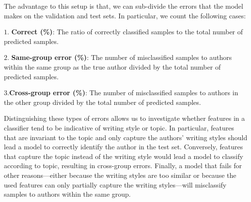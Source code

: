 \documentclass[11pt]{article}
\begin{document}

The advantage to this setup is that, we can sub-divide the errors that the model makes on the validation and test sets. In particular, we count the following cases:

\noindent$1.$ \textbf{Correct (\%)}: The ratio of correctly classified samples to the total number of predicted samples.

\noindent$2.$ \textbf{Same-group error (\%)}: The number of misclassified samples to authors within the same group as the true author divided by the total number of predicted samples.

\noindent$3.$\textbf{Cross-group error (\%)}: The number of misclassified samples to authors in the other group divided by the total number of predicted samples.

Distinguishing these types of errors allows us to investigate whether features in a classifier tend to be indicative of writing style or topic. In particular, features that are invariant to the topic and only capture the authors' writing styles should lead a model to correctly identify the author in the test set. Conversely, features that capture the topic instead of the writing style would lead a model to classify according to topic, resulting in cross-group errors. Finally, a model that fails for other reasons---either because the writing styles are too similar or because the used features can only partially capture the writing styles---will misclassify samples to authors within the same group.

\end{document}

